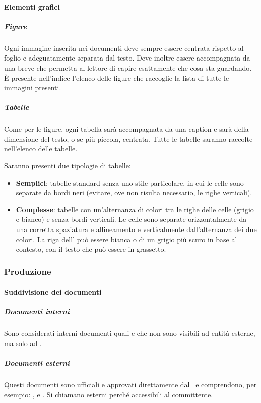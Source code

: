 			\paragraph{Elementi grafici}

			\subparagraph{Figure}
			Ogni immagine inserita nei documenti deve sempre essere centrata rispetto al foglio e adeguatamente separata dal testo. Deve inoltre essere
			accompagnata da una breve  che permetta al lettore di capire esattamente che cosa sta guardando. È presente nell'indice l'elenco
			delle figure che raccoglie la lista di tutte le immagini presenti.

			\subparagraph{Tabelle}
			Come per le figure, ogni tabella sarà accompagnata da una caption e sarà della dimensione del testo, o se più piccola, centrata.
			Tutte le tabelle saranno raccolte nell'elenco delle tabelle.\par
			Saranno presenti due tipologie di tabelle:
			\begin{itemize}
				\item \textbf{Semplici}: tabelle standard senza uno stile particolare, in cui le celle sono separate da bordi neri (evitare, ove non risulta necessario,
					le righe verticali).
				\item \textbf{Complesse}: tabelle con un'alternanza di colori tra le righe delle celle (grigio e bianco) e senza bordi verticali.
					Le celle sono separate orizzontalmente da una corretta spaziatura e allineamento e verticalmente dall'alternanza dei due colori.
					La riga dell' può essere bianca o di un grigio più scuro in base al contesto, con il testo che può essere in grassetto.
			\end{itemize}


		\subsubsection{Produzione}

			\paragraph{Suddivisione dei documenti}

			\subparagraph{Documenti interni}
			Sono considerati interni documenti quali \Doc{\SdF} e \Doc{\NdP} che non sono visibili ad entità esterne,
			ma solo ad \gruppo.

			\subparagraph{Documenti esterni}
			Questi documenti sono ufficiali e approvati direttamente dal \Res\ e comprendono, per esempio: \Doc{\PdP},
			\Doc{\PdQ} e \Doc{\AdR}. Si chiamano esterni perché accessibili al committente.


